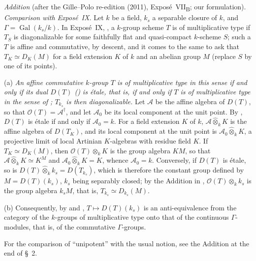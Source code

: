 
\par\medskip\noindent
\emph{Addition} (after the Gille--Polo re-edition (2011),
Expos\'e~VII\textsubscript{B}; our formulation). \emph{Comparison with
Expos\'e~IX.} Let \(k\) be a field, \(k_s\) a separable closure of \(k\), and
\(\Gamma=\operatorname{Gal}(k_s/k)\). In Expos\'e~IX, , a
\(k\)-group scheme \(T\) is of multiplicative type if \(T_S\) is
diagonalizable for some faithfully flat and quasi-compact \(k\)-scheme
\(S\); such a \(T\) is affine and commutative, by descent, and it comes to
the same to ask that \(T_K\simeq D_K(M)\) for a field extension \(K\) of
\(k\) and an abelian group \(M\) (replace \(S\) by one of its points).

(a) \emph{An affine commutative \(k\)-group \(T\) is of multiplicative type
in this sense if and only if its dual \(D(T)\) \textup{()} is étale, that
is, if and only if \(T\) is of multiplicative type in the sense of
; \(T_{k_s}\) is then diagonalizable.} Let \(\mathcal A\) be the
affine algebra of \(D(T)\), so that \(\mathcal O(T)=\mathcal A^\dagger\), and
let \(\mathcal A_0\) be its local component at the unit point. By
, \(D(T)\) is étale if and only if \(\mathcal A_0=k\). For a field
extension \(K\) of \(k\), \(\mathcal A\widehat\otimes_kK\) is the affine
algebra of \(D(T_K)\), and its local component at the unit point is
\(\mathcal A_0\widehat\otimes_kK\), a projective limit of local Artinian
\(K\)-algebras with residue field \(K\). If \(T_K\simeq D_K(M)\), then
\(\mathcal O(T)\otimes_kK\) is the group algebra \(KM\), so that
\(\mathcal A\widehat\otimes_kK\simeq K^M\) and
\(\mathcal A_0\widehat\otimes_kK=K\), whence \(\mathcal A_0=k\). Conversely,
if \(D(T)\) is étale, so is \(D(T)\widehat\otimes_kk_s=D(T_{k_s})\), which is
therefore the constant group defined by \(M=D(T)(k_s)\), \(k_s\) being
separably closed; by the Addition in , \(\mathcal O(T)\otimes_kk_s\) is
the group algebra \(k_sM\), that is, \(T_{k_s}\simeq D_{k_s}(M)\).

(b) Consequently, by  and , \(T\mapsto D(T)(k_s)\) is an
anti-equivalence from the category of the \(k\)-groups of multiplicative
type onto that of the continuous \(\Gamma\)-modules, that is, of the
commutative \(\Gamma\)-groups.

For the comparison of ``unipotent'' with the usual notion, see the
Addition at the end of \S~2.

